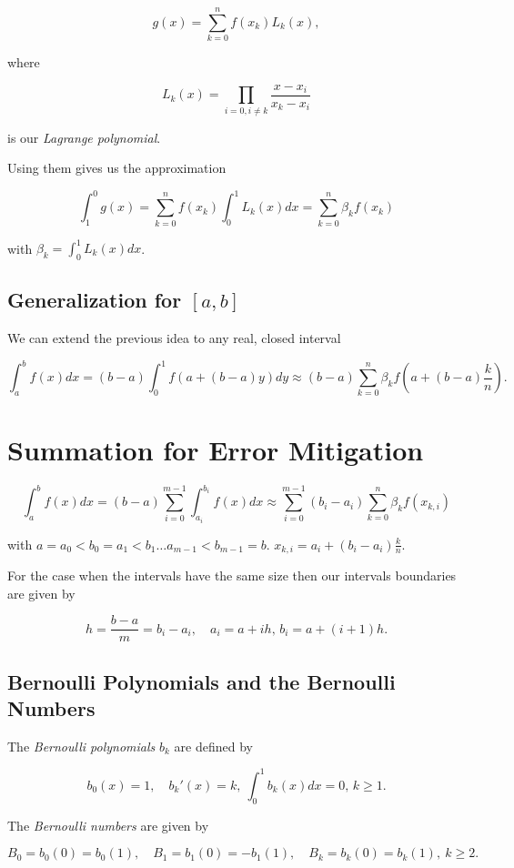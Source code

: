 \[
    g(x) = \sum_{k = 0}^{n} f(x_k) L_k (x),
\]

where 

\[
    L_k(x) = \prod_{i = 0, i \ne k} \frac{x - x_i}{x_k - x_i}
\]

is our \emph{Lagrange polynomial}.

Using them gives us the approximation 

\[
    \int_1^0 g(x) = \sum_{k = 0}^{n}f(x_k) \int_0^1 L_k (x) dx = \sum_{k = 0}^n \beta_k f(x_k)
\]

with \(\beta_k = \int_0^1 L_k (x) dx\).

\subsection{Generalization for \texorpdfstring{\([a,b]\)}{}}

We can extend the previous idea to any real, closed interval 

\[
    \int_a^b f(x) dx = (b - a) \int_0^1 f(a + (b - a)y) dy \approx (b - a) \sum_{k = 0}^n \beta_k f \left(a + (b - a)\frac{k}{n}\right).
\]

\section{Summation for Error Mitigation}

\[
    \int_a^b f(x) dx = (b - a) \sum_{i = 0}^{m - 1} \int_{a_i}^{b_i} f(x) dx \approx \sum_{i = 0}^{m - 1}(b_i - a_i) \sum_{k = 0}^n \beta_k f(x_{k,i})
\]

with \(a = a_0 < b_0 = a_1 < b_1 \dots a_{m - 1} < b_{m - 1} = b\). \(x_{k, i} = a_i + (b_i - a_i)\frac{k}{n}\).

For the case when the intervals have the same size then our intervals boundaries are given by 

\[
    h = \frac{b - a}{m} = b_i - a_i, \quad a_i = a + ih, \, b_i = a + (i + 1)h.
\]

\subsection{Bernoulli Polynomials and the Bernoulli Numbers}

The \emph{Bernoulli polynomials} \(b_k\) are defined by 

\[
    b_0(x) = 1, \quad b_k'(x) = k, \ \int_0^1 b_k(x)dx = 0, \, k \ge 1.
\]

The \emph{Bernoulli numbers} are given by 

\[
    B_0 = b_0(0) = b_0(1), \quad B_1 = b_1(0) = -b_1(1), \quad B_k = b_k(0) = b_k(1), \ k \ge 2.
\]

